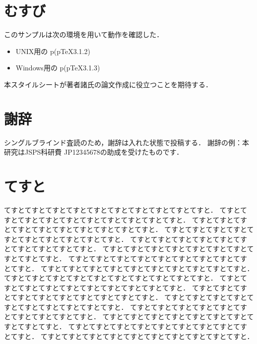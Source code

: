 \documentclass[twoside]{wiss}
\begin{document}
\section{むすび}

このサンプルは次の環境を用いて動作を確認した．
\begin{itemize}
\item UNIX用の p\LaTeXe (p\TeX3.1.2)
\item Windows用の p\LaTeXe (p\TeX3.1.3)
\end{itemize}
本スタイルシートが著者諸氏の論文作成に役立つことを期待する．

\section*{謝辞}
シングルブラインド査読のため，謝辞は入れた状態で投稿する．
謝辞の例：本研究はJSPS科研費 JP12345678の助成を受けたものです．







\section{てすと}

てすとてすとてすとてすとてすとてすとてすとてすとてすとてすと．
てすとてすとてすとてすとてすとてすとてすとてすとてすとてすと．
てすとてすとてすとてすとてすとてすとてすとてすとてすとてすと．
てすとてすとてすとてすとてすとてすとてすとてすとてすとてすと．
てすとてすとてすとてすとてすとてすとてすとてすとてすとてすと．
てすとてすとてすとてすとてすとてすとてすとてすとてすとてすと．
てすとてすとてすとてすとてすとてすとてすとてすとてすとてすと．
てすとてすとてすとてすとてすとてすとてすとてすとてすとてすと．
てすとてすとてすとてすとてすとてすとてすとてすとてすとてすと．
てすとてすとてすとてすとてすとてすとてすとてすとてすとてすと．
てすとてすとてすとてすとてすとてすとてすとてすとてすとてすと．
てすとてすとてすとてすとてすとてすとてすとてすとてすとてすと．
てすとてすとてすとてすとてすとてすとてすとてすとてすとてすと．
てすとてすとてすとてすとてすとてすとてすとてすとてすとてすと．
てすとてすとてすとてすとてすとてすとてすとてすとてすとてすと．
てすとてすとてすとてすとてすとてすとてすとてすとてすとてすと．
\end{document}
